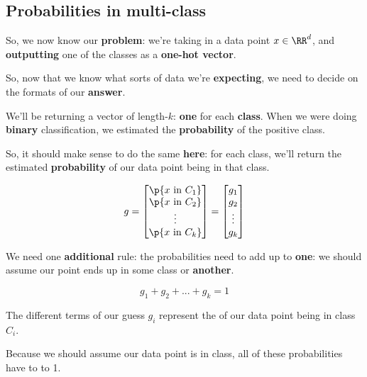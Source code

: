     \subsection{Probabilities in multi-class}
    
        So, we now know our \textbf{problem}: we're taking in a data point $x \in \RR^d$, and \textbf{outputting} one of the classes as a \textbf{one-hot vector}.
        
        So, now that we know what sorts of data we're \textbf{expecting}, we need to decide on the formats of our \textbf{answer}.
        
        We'll be returning a vector of length-$k$: \textbf{one} for each \textbf{class}. When we were doing \textbf{binary} classification, we estimated the \textbf{probability} of the positive class.
        
        So, it should make sense to do the same \textbf{here}: for each class, we'll return the estimated \textbf{probability} of our data point being in that class.
        
        \begin{equation}
            g
            =
            \begin{bmatrix}
              \p{x \text{ in } C_1} \\ 
              \p{x \text{ in } C_2} \\ 
              \vdots \\ 
              \p{x \text{ in } C_k} 
            \end{bmatrix}
            =
            \begin{bmatrix}
              g_1\\g_2\\\vdots\\g_k
            \end{bmatrix}
        \end{equation}
        
        We need one \textbf{additional} rule: the probabilities need to add up to \textbf{one}: we should assume our point ends up in some class or \textbf{another}.
        
        \begin{equation}
            g_1+g_2+...+g_k=1
        \end{equation}
        
        \begin{concept}
            The different terms of our  guess $g_i$ represent the  of our data point being in class $C_i$.
            
            Because we should assume our data point is in  class, all of these probabilities have to  to 1.
        \end{concept}


